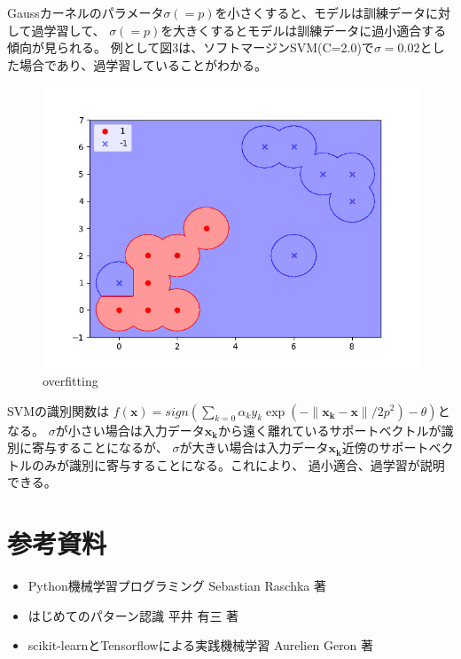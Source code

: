 \documentclass{jsarticle}
\begin{document}
Gaussカーネルのパラメータ$\sigma(= p)$を小さくすると、モデルは訓練データに対して過学習して、
$\sigma(= p)$を大きくするとモデルは訓練データに過小適合する傾向が見られる。
例として図3は、ソフトマージンSVM(C=2.0)で$\sigma=0.02$とした場合であり、過学習していることがわかる。
\begin{figure}[!h]
\centering \includegraphics[width=15cm]{overfitting.png}
\caption{overfitting}
\end{figure}
SVMの識別関数は
$f(\bm{x}) = sign(\sum_{k=0} \alpha_k y_k \exp(-\|\bm{x_k}-\bm{x}\| / 2p^2) - \theta)$となる。
$\sigma$が小さい場合は入力データ$\bm{x_k}$から遠く離れているサポートベクトルが識別に寄与することになるが、
$\sigma$が大きい場合は入力データ$\bm{x_k}$近傍のサポートベクトルのみが識別に寄与することになる。これにより、
過小適合、過学習が説明できる。

\section{参考資料}
\begin{itemize}
    \item Python機械学習プログラミング Sebastian Raschka 著
    \item はじめてのパターン認識 平井 有三 著
    \item scikit-learnとTensorflowによる実践機械学習 Aurelien Geron 著
\end{itemize}
\end{document}
